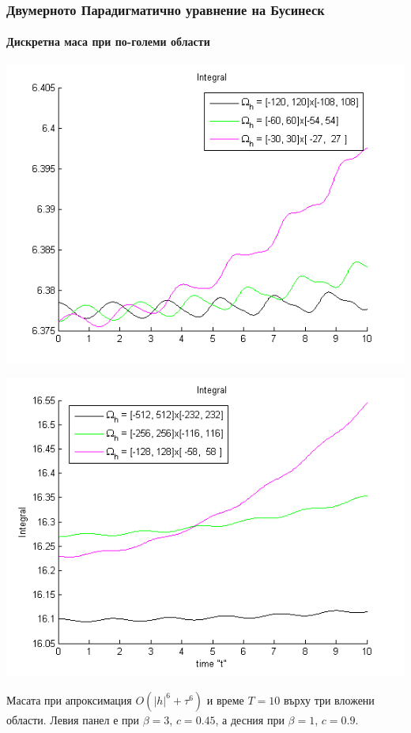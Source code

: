 \documentclass{beamer}
\begin{document}

\begin{frame}
\frametitle{Двумерното Парадигматично уравнение на Бусинеск}
\framesubtitle{Дискретна маса при по-големи области}
\begin{center}\vspace{0.4cm}
	\begin{minipage}[b]{0.49\linewidth}
		\includegraphics[width=\linewidth]{../amitans/figures/MassTaylor_120_60_30_ZB1_bt3_c045_h020_O(h^6).png}
	\end{minipage}	
	\begin{minipage}[b]{0.49\linewidth}
		\includegraphics[width=\linewidth]{../amitans/figures/MassTaylor_512_256_128_ZB1_bt1_c090_h040_O(h^6).png}
		
	\end{minipage}
\end{center}
Масата при апроксимация $O(|h|^6 + \tau^6)$ и време $T = 10$ върху три вложени области. Левия панел е при $\beta=3$, $c = 0.45$, а десния при $\beta=1$, $c = 0.9$.
\end{frame}
\end{document}
